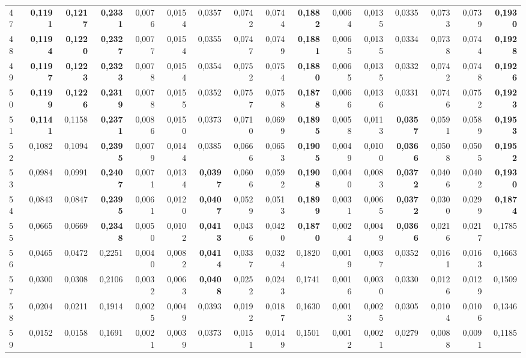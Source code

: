 \begin{table}[htp!]
\begin{adjustwidth}{-2cm}{}
\begin{tabular}{ l | *{15}{| r}}
47	&	\textbf{0,1191}	&	\textbf{0,1217}	&	\textbf{0,2331}	&	0,0076	&	0,0154	&	0,0357	&	0,0742	&	0,0744	&	\textbf{0,1882}	&	0,0064	&	0,0135	&	0,0335	&	0,0733	&	0,0739	&	\textbf{0,1930}	\\
48	&	\textbf{0,1194}	&	\textbf{0,1220}	&	\textbf{0,2327}	&	0,0077	&	0,0154	&	0,0355	&	0,0747	&	0,0749	&	\textbf{0,1881}	&	0,0065	&	0,0135	&	0,0334	&	0,0738	&	0,0744	&	\textbf{0,1928}	\\
49	&	\textbf{0,1197}	&	\textbf{0,1223}	&	\textbf{0,2323}	&	0,0078	&	0,0154	&	0,0354	&	0,0752	&	0,0754	&	\textbf{0,1880}	&	0,0065	&	0,0135	&	0,0332	&	0,0742	&	0,0748	&	\textbf{0,1926}	\\
50	&	\textbf{0,1199}	&	\textbf{0,1226}	&	\textbf{0,2319}	&	0,0078	&	0,0155	&	0,0352	&	0,0757	&	0,0758	&	\textbf{0,1878}	&	0,0066	&	0,0136	&	0,0331	&	0,0746	&	0,0752	&	\textbf{0,1923}	\\
51	&	\textbf{0,1141}	&	0,1158	&	\textbf{0,2371}	&	0,0086	&	0,0150	&	0,0373	&	0,0710	&	0,0699	&	\textbf{0,1895}	&	0,0058	&	0,0113	&	\textbf{0,0357}	&	0,0591	&	0,0589	&	\textbf{0,1953}	\\
52	&	0,1082	&	0,1094	&	\textbf{0,2395}	&	0,0079	&	0,0144	&	0,0385	&	0,0666	&	0,0653	&	\textbf{0,1905}	&	0,0049	&	0,0100	&	\textbf{0,0366}	&	0,0508	&	0,0505	&	\textbf{0,1952}	\\
53	&	0,0984	&	0,0991	&	\textbf{0,2407}	&	0,0071	&	0,0134	&	\textbf{0,0397}	&	0,0606	&	0,0592	&	\textbf{0,1908}	&	0,0040	&	0,0083	&	\textbf{0,0372}	&	0,0406	&	0,0402	&	\textbf{0,1930}	\\
54	&	0,0843	&	0,0847	&	\textbf{0,2395}	&	0,0061	&	0,0120	&	\textbf{0,0407}	&	0,0529	&	0,0513	&	\textbf{0,1899}	&	0,0031	&	0,0065	&	\textbf{0,0372}	&	0,0300	&	0,0299	&	\textbf{0,1874}	\\
55	&	0,0665	&	0,0669	&	\textbf{0,2348}	&	0,0050	&	0,0102	&	\textbf{0,0413}	&	0,0436	&	0,0420	&	\textbf{0,1870}	&	0,0024	&	0,0049	&	\textbf{0,0366}	&	0,0216	&	0,0217	&	0,1785	\\
56	&	0,0465	&	0,0472	&	0,2251	&	0,0040	&	0,0082	&	\textbf{0,0414}	&	0,0337	&	0,0324	&	0,1820	&	0,0019	&	0,0037	&	0,0352	&	0,0161	&	0,0163	&	0,1663	\\
57	&	0,0300	&	0,0308	&	0,2106	&	0,0032	&	0,0063	&	\textbf{0,0408}	&	0,0252	&	0,0243	&	0,1741	&	0,0016	&	0,0030	&	0,0330	&	0,0126	&	0,0129	&	0,1509	\\
58	&	0,0204	&	0,0211	&	0,1914	&	0,0025	&	0,0049	&	0,0393	&	0,0192	&	0,0187	&	0,1630	&	0,0013	&	0,0025	&	0,0305	&	0,0104	&	0,0106	&	0,1346	\\
59	&	0,0152	&	0,0158	&	0,1691	&	0,0021	&	0,0039	&	0,0373	&	0,0151	&	0,0149	&	0,1501	&	0,0012	&	0,0021	&	0,0279	&	0,0088	&	0,0091	&	0,1185	\\

\end{tabular}
\end{adjustwidth}
\end{table}
